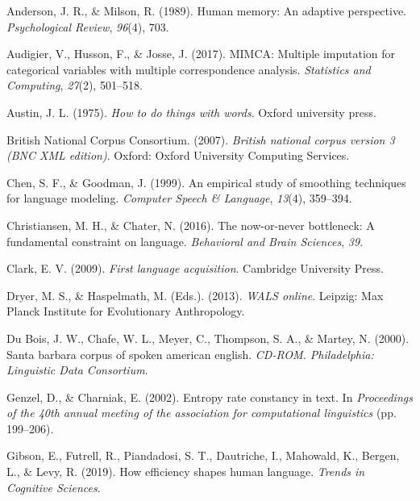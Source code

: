 \documentclass[10pt, letterpaper]{article}
\begin{document}
\setlength{\parindent}{-0.1in} 
\setlength{\leftskip}{0.125in}

\noindent

\hypertarget{refs}{}
\leavevmode\hypertarget{ref-anderson1989}{}%
Anderson, J. R., \& Milson, R. (1989). Human memory: An adaptive
perspective. \emph{Psychological Review}, \emph{96}(4), 703.

\leavevmode\hypertarget{ref-audigier2017}{}%
Audigier, V., Husson, F., \& Josse, J. (2017). MIMCA: Multiple
imputation for categorical variables with multiple correspondence
analysis. \emph{Statistics and Computing}, \emph{27}(2), 501--518.

\leavevmode\hypertarget{ref-austin1975}{}%
Austin, J. L. (1975). \emph{How to do things with words}. Oxford
university press.

\leavevmode\hypertarget{ref-british-national-corpus-consortium2007}{}%
British National Corpus Consortium. (2007). \emph{British national
corpus version 3 (BNC XML edition)}. Oxford: Oxford University Computing
Services.

\leavevmode\hypertarget{ref-chen1999}{}%
Chen, S. F., \& Goodman, J. (1999). An empirical study of smoothing
techniques for language modeling. \emph{Computer Speech \& Language},
\emph{13}(4), 359--394.

\leavevmode\hypertarget{ref-christiansen2016}{}%
Christiansen, M. H., \& Chater, N. (2016). The now-or-never bottleneck:
A fundamental constraint on language. \emph{Behavioral and Brain
Sciences}, \emph{39}.

\leavevmode\hypertarget{ref-clark2009}{}%
Clark, E. V. (2009). \emph{First language acquisition}. Cambridge
University Press.

\leavevmode\hypertarget{ref-2013}{}%
Dryer, M. S., \& Haspelmath, M. (Eds.). (2013). \emph{WALS online}.
Leipzig: Max Planck Institute for Evolutionary Anthropology.

\leavevmode\hypertarget{ref-sbc}{}%
Du Bois, J. W., Chafe, W. L., Meyer, C., Thompson, S. A., \& Martey, N.
(2000). Santa barbara corpus of spoken american english. \emph{CD-ROM.
Philadelphia: Linguistic Data Consortium}.

\leavevmode\hypertarget{ref-genzel2002}{}%
Genzel, D., \& Charniak, E. (2002). Entropy rate constancy in text. In
\emph{Proceedings of the 40th annual meeting of the association for
computational linguistics} (pp. 199--206).

\leavevmode\hypertarget{ref-gibson2019}{}%
Gibson, E., Futrell, R., Piandadosi, S. T., Dautriche, I., Mahowald, K.,
Bergen, L., \& Levy, R. (2019). How efficiency shapes human language.
\emph{Trends in Cognitive Sciences}.
\end{document}
